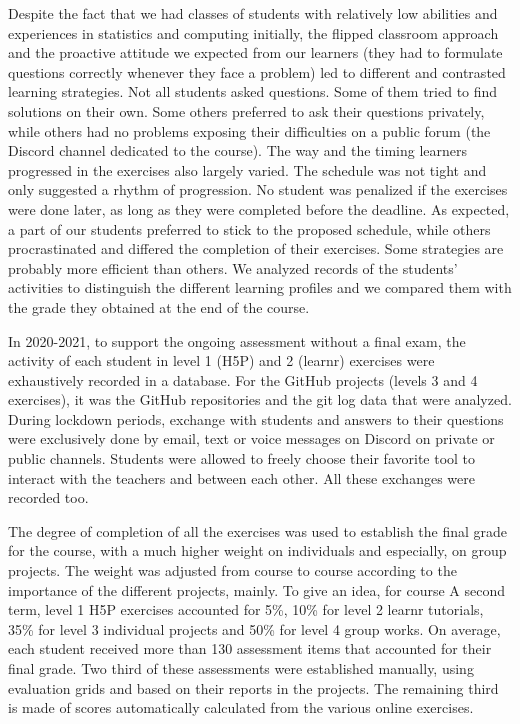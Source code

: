 \documentclass{aims}
\theoremstyle{definition}
\begin{document}
Despite the fact that we had classes of students with relatively low
abilities and experiences in statistics and computing initially, the
flipped classroom approach and the proactive attitude we expected from
our learners (they had to formulate questions correctly whenever they
face a problem) led to different and contrasted learning strategies. Not
all students asked questions. Some of them tried to find solutions on
their own. Some others preferred to ask their questions privately, while
others had no problems exposing their difficulties on a public forum
(the Discord channel dedicated to the course). The way and the timing
learners progressed in the exercises also largely varied. The schedule
was not tight and only suggested a rhythm of progression. No student was
penalized if the exercises were done later, as long as they were
completed before the deadline. As expected, a part of our students
preferred to stick to the proposed schedule, while others procrastinated
and differed the completion of their exercises. Some strategies are
probably more efficient than others. We analyzed records of the
students' activities to distinguish the different learning profiles and
we compared them with the grade they obtained at the end of the course.

In 2020-2021, to support the ongoing assessment without a final exam,
the activity of each student in level 1 (H5P) and 2 (learnr) exercises
were exhaustively recorded in a database. For the GitHub projects
(levels 3 and 4 exercises), it was the GitHub repositories and the git
log data that were analyzed. During lockdown periods, exchange with
students and answers to their questions were exclusively done by email,
text or voice messages on Discord on private or public channels.
Students were allowed to freely choose their favorite tool to interact
with the teachers and between each other. All these exchanges were
recorded too.

The degree of completion of all the exercises was used to establish the
final grade for the course, with a much higher weight on individuals and
especially, on group projects. The weight was adjusted from course to
course according to the importance of the different projects, mainly. To
give an idea, for course A second term, level 1 H5P exercises accounted
for 5\%, 10\% for level 2 learnr tutorials, 35\% for level 3 individual
projects and 50\% for level 4 group works. On average, each student
received more than 130 assessment items that accounted for their final
grade. Two third of these assessments were established manually, using
evaluation grids and based on their reports in the projects. The
remaining third is made of scores automatically calculated from the
various online exercises.
\end{document}
